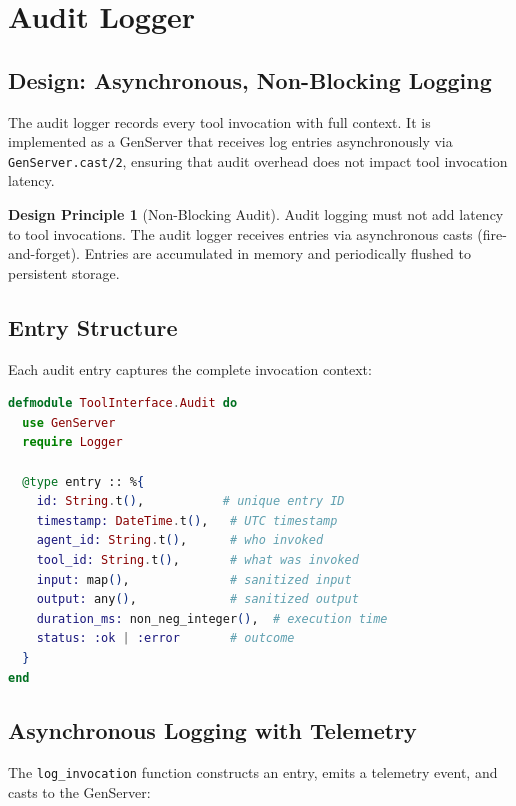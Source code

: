 \documentclass[12pt,a4paper]{article}
\theoremstyle{plain}
\theoremstyle{definition}
\newtheorem{designprinciple}[theorem]{Design Principle}
\begin{document}
\section{Audit Logger}
\label{sec:audit}

\subsection{Design: Asynchronous, Non-Blocking Logging}

The audit logger records every tool invocation with full context. It is implemented as a GenServer that receives log entries asynchronously via \texttt{GenServer.cast/2}, ensuring that audit overhead does not impact tool invocation latency.

\begin{designprinciple}[Non-Blocking Audit]
\label{dp:audit}
Audit logging must not add latency to tool invocations. The audit logger receives entries via asynchronous casts (fire-and-forget). Entries are accumulated in memory and periodically flushed to persistent storage.
\end{designprinciple}

\subsection{Entry Structure}

Each audit entry captures the complete invocation context:

\begin{lstlisting}[language=elixir, caption={Audit entry structure.}, label={lst:audit-entry}]
defmodule ToolInterface.Audit do
  use GenServer
  require Logger

  @type entry :: %{
    id: String.t(),           # unique entry ID
    timestamp: DateTime.t(),   # UTC timestamp
    agent_id: String.t(),      # who invoked
    tool_id: String.t(),       # what was invoked
    input: map(),              # sanitized input
    output: any(),             # sanitized output
    duration_ms: non_neg_integer(),  # execution time
    status: :ok | :error       # outcome
  }
end
\end{lstlisting}

\subsection{Asynchronous Logging with Telemetry}

The \texttt{log\_invocation} function constructs an entry, emits a telemetry event, and casts to the GenServer:
\end{document}
